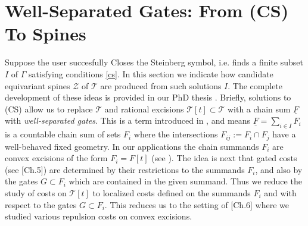 \documentclass[12pt]{amsart}
\theoremstyle{definition}
\theoremstyle{remark}
\newcommand{\bZ}{\mathbb{Z}}
\newcommand{\uF}{\underline{F}}
\newcommand{\sT}{\mathscr{T}}
\newcommand{\sZ}{\mathscr{Z}}
\begin{document}



\section{Well-Separated Gates: From (CS) To Spines}
Suppose the user succesfully Closes the Steinberg symbol, i.e. finds a finite subset $I$ of $\Gamma$ satisfying conditions \ref{cs}. In this section we indicate how candidate equivariant spines $\sZ$ of $\sT$ are produced from such solutions $I$. The complete development of these ideas is provided in our PhD thesis \cite{martel}. Briefly, solutions to (CS) allow us to replace $\sT$ and rational excisions $\sT[t] \subset \sT$ with a chain sum $\uF$ with \textit{well-separated gates}. This is a term introduced in \cite{martel}, and means $\uF=\sum_{i\in I} F_i$ is a countable chain sum of sets $F_i$ where the intersections $F_{ij}:=F_i\cap F_j$ have a well-behaved fixed geometry. In our applications the chain summands $F_i$ are convex excisions of the form $F_i=F[t]$ (see \cite{martel}). The idea is next that gated costs (see \cite{martel}[Ch.5]) are determined by their restrictions to the summands $F_i$, and also by the gates $G\subset F_i$ which are contained in the given summand. Thus we reduce the study of costs on $\sT[t]$ to localized costs defined on the summands $F_i$ and with respect to the gates $G\subset F_i$. This reduces us to the setting of \cite{martel}[Ch.6] where we studied various repulsion costs on convex excisions. 
\end{document}
